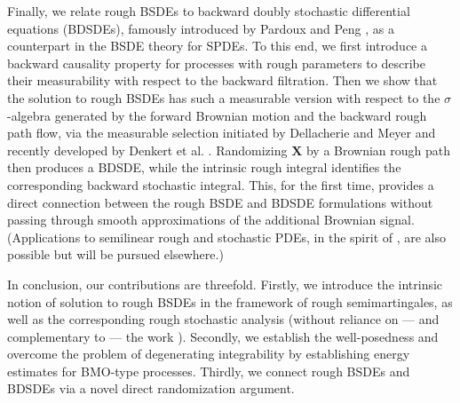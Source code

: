\documentclass[11pt,reqno]{amsart}
\numberwithin{equation}{section}
\begin{document}
Finally, we relate rough BSDEs to backward doubly stochastic differential
equations (BDSDEs), famously introduced by Pardoux and Peng \cite{PardouxPeng1994BDSDE}, as a counterpart in the BSDE theory for SPDEs.
To this end, we first introduce a backward causality property for processes with rough parameters to describe their measurability with respect to the backward filtration. Then we show that the solution to rough BSDEs has such a measurable version with respect to the $\sigma$-algebra generated by the forward Brownian motion and the backward rough path flow, via the measurable selection initiated by Dellacherie and Meyer \cite{Meyer1978} and recently developed by Denkert et al. \cite{DKP24}. Randomizing $\mathbf X$ by a Brownian rough path then produces
a BDSDE, while the intrinsic rough integral identifies the corresponding
backward stochastic integral. This, for the first time, provides a direct connection between the
rough BSDE and BDSDE formulations without passing through smooth
approximations of the additional Brownian signal. (Applications to semilinear rough and stochastic PDEs, in the spirit of \cite{PardouxPeng1994BDSDE,LionsSouganidis2000semilinear,DF,liang2025multidimensional}, are also possible but will be pursued elsewhere.)


In conclusion, our contributions are threefold. Firstly, we introduce the intrinsic notion of solution to rough BSDEs in the framework of rough semimartingales, as well as the corresponding rough stochastic analysis (without reliance on --- and complementary to --- the work \cite{fhl21}).
Secondly, we establish the well-posedness and overcome the problem of degenerating integrability by establishing energy estimates for BMO-type processes. Thirdly, we connect rough BSDEs and BDSDEs via a novel direct randomization argument.
\end{document}
